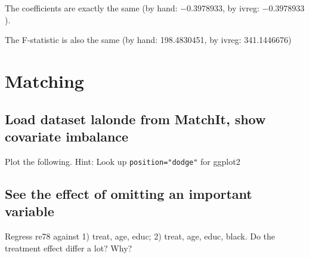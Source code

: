 \documentclass{article}
\begin{document}
The coefficients are exactly the same (by hand: \ensuremath{-0.3978933}, by ivreg: \ensuremath{-0.3978933}).

The F-statistic is also the same (by hand: 198.4830451, by ivreg: 341.1446676)

\section{Matching}

\subsection{Load dataset lalonde from MatchIt, show covariate imbalance}

Plot the following. Hint: Look up \verb|position="dodge"| for ggplot2

\begin{knitrout}
\color{fgcolor}\begin{kframe}
\begin{alltt}
\end{alltt}


{\ttfamily\noindent\bfseries\color{errorcolor}{\#\# Error in library(MatchIt): there is no package called 'MatchIt'}}\begin{alltt}
\hlstd{(}\hlstd{)}
\end{alltt}


{\ttfamily\noindent{}}\begin{alltt}
\hlstd{(}  \hlopt{+}
  \hlstd{(}\hlstd{(}   \hlstd{=} 
                  \hlstd{=} \hlstd{)}
\end{alltt}


{\ttfamily\noindent\bfseries\color{errorcolor}{\#\# Error in ggplot(data = lalonde): object 'lalonde' not found}}\end{kframe}
\end{knitrout}

\subsection{See the effect of omitting an important variable}

Regress re78 against 1) treat, age, educ; 2) treat, age, educ, black. Do the treatment effect differ a lot? Why?
\end{document}
